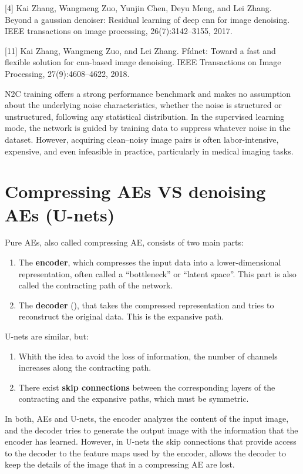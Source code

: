 [4] Kai Zhang, Wangmeng Zuo, Yunjin Chen, Deyu Meng, and Lei Zhang. Beyond a gaussian denoiser: Residual
learning of deep cnn for image denoising. IEEE transactions on image processing, 26(7):3142–3155, 2017.

[11] Kai Zhang, Wangmeng Zuo, and Lei Zhang. Ffdnet: Toward a fast and flexible solution for cnn-based image
denoising. IEEE Transactions on Image Processing, 27(9):4608–4622, 2018.

N2C training offers a strong performance benchmark and makes no
assumption about the underlying noise characteristics, whether the
noise is structured or unstructured, following any statistical
distribution. In the supervised learning mode, the network is guided
by training data to suppress whatever noise in the dataset. However,
acquiring clean–noisy image pairs is often labor-intensive, expensive,
and even infeasible in practice, particularly in medical imaging
tasks.  %

\section{Compressing AEs VS denoising AEs (U-nets)}

Pure AEs, also called compressing AE, consists of two main parts:
\begin{enumerate}
\item The \textbf{encoder}, which compresses the
  input data into a lower-dimensional representation, often called a
  ``bottleneck'' or ``latent space''. This part is also called the
  contracting path of the network.
\item The \textbf{decoder} (), that takes the compressed representation
  and tries to reconstruct the original data. This is the expansive path.
\end{enumerate}

U-nets are similar, but:
\begin{enumerate}
\item Whith the idea to avoid the loss of information, the number of
  channels increases along the contracting path.
\item There exist \textbf{skip connections} between the corresponding
  layers of the contracting and the expansive paths, which must be
  symmetric.
\end{enumerate}

In both, AEs and U-nets, the encoder analyzes the content of the input
image, and the decoder tries to generate the output image with the
information that the encoder has learned. However, in U-nets the skip
connections that provide access to the decoder to the feature maps
used by the encoder, allows the decoder to keep the details of the
image that in a compressing AE are lost.

